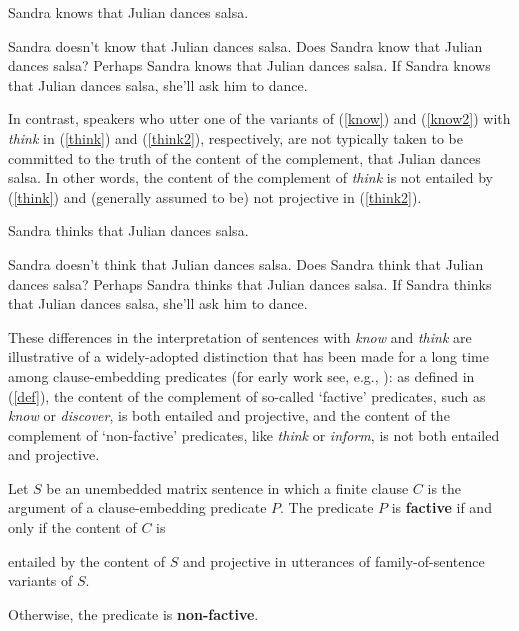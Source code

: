 \documentclass[11pt,fleqn]{article}
\newcommand{\6}{\mbox{$[\hspace*{-.6mm}[$}}
\newcommand{\9}{\mbox{$]\hspace*{-.6mm}]$}}
\begin{document}
\begin{exe}

\ex\label{know} Sandra knows that Julian dances salsa.

\ex\label{know2} 

\begin{xlist} 
\ex Sandra doesn't know that Julian dances salsa. 
\ex Does Sandra know that Julian dances salsa?
\ex Perhaps Sandra knows that Julian dances salsa.
\ex If Sandra knows that Julian dances salsa, she'll ask him to dance. 
\end{xlist}

\end{exe}

In contrast, speakers who utter one of the variants of (\ref{know}) and (\ref{know2}) with {\em think} in (\ref{think}) and (\ref{think2}), respectively, are not typically taken to be committed to the truth of the content of the complement, that Julian dances salsa. In other words, the content of the complement of {\em think} is not entailed by (\ref{think}) and (generally assumed to be) not projective in (\ref{think2}).

\begin{exe}

\ex\label{think} Sandra thinks that Julian dances salsa.
\ex\label{think2} 

\begin{xlist} 
\ex Sandra doesn't think that Julian dances salsa. 
\ex Does Sandra think that Julian dances salsa?
\ex Perhaps Sandra thinks that Julian dances salsa.
\ex If Sandra thinks that Julian dances salsa, she'll ask him to dance. 
\end{xlist}

\end{exe}

These differences in the interpretation of sentences with {\em know} and {\em think} are illustrative of a widely-adopted distinction that has been made for a long time among clause-embedding predicates (for early work see, e.g., \citealt{karttunen71b,kiparsky-kiparsky71}): as defined in (\ref{def}), the content of the complement of so-called `factive' predicates, such as {\em know} or {\em discover}, is both entailed and projective, and the content of the complement of `non-factive' predicates, like {\em think} or {\em inform},  is not both entailed and projective. 

\begin{exe}
\ex\label{def} Let $S$ be an unembedded matrix sentence in which a finite clause $C$ is the argument of a clause-embedding predicate $P$. The predicate $P$ is {\bf factive} if and only if the content of $C$ is

\begin{xlist}
\ex entailed by the content of $S$ and
\ex projective in utterances of family-of-sentence variants of $S$.
\end{xlist}
Otherwise, the predicate is {\bf non-factive}.
\end{exe}
\end{document}
